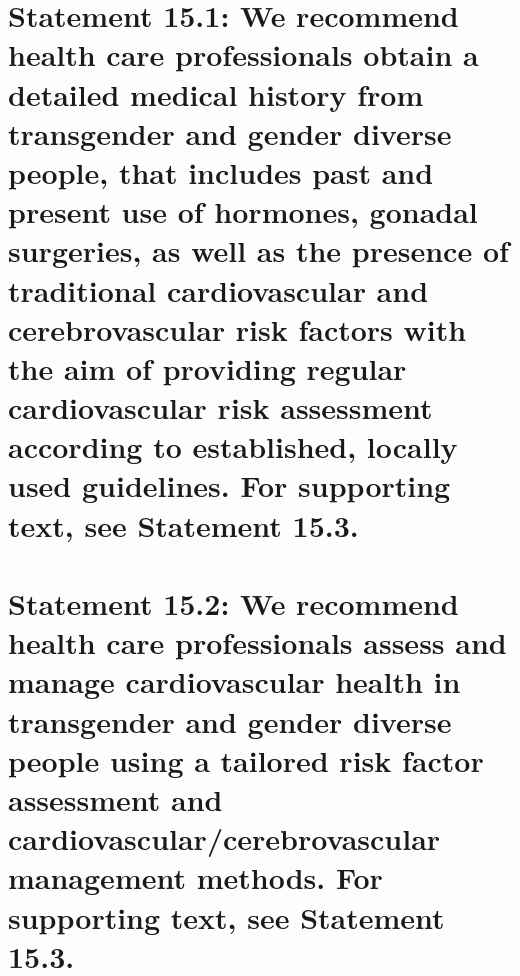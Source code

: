 \documentclass[
]{book}
\begin{document}
\hypertarget{statement-15.1-we-recommend-health-care-professionals-obtain-a-detailed-medical-history-from-transgender-and-gender-diverse-people-that-includes-past-and-present-use-of-hormones-gonadal-surgeries-as-well-as-the-presence-of-traditional-cardiovascular-and-cerebrovascular-risk-factors-with-the-aim-of-providing-regular-cardiovascular-risk-assessment-according-to-established-locally-used-guidelines.-for-supporting-text-see-statement-15.3.}{%
\section*{Statement 15.1: We recommend health care professionals obtain a detailed medical history from transgender and gender diverse people, that includes past and present use of hormones, gonadal surgeries, as well as the presence of traditional cardiovascular and cerebrovascular risk factors with the aim of providing regular cardiovascular risk assessment according to established, locally used guidelines. For supporting text, see Statement 15.3.}\label{statement-15.1-we-recommend-health-care-professionals-obtain-a-detailed-medical-history-from-transgender-and-gender-diverse-people-that-includes-past-and-present-use-of-hormones-gonadal-surgeries-as-well-as-the-presence-of-traditional-cardiovascular-and-cerebrovascular-risk-factors-with-the-aim-of-providing-regular-cardiovascular-risk-assessment-according-to-established-locally-used-guidelines.-for-supporting-text-see-statement-15.3.}}

\hypertarget{statement-15.2-we-recommend-health-care-professionals-assess-and-manage-cardiovascular-health-in-transgender-and-gender-diverse-people-using-a-tailored-risk-factor-assessment-and-cardiovascularcerebrovascular-management-methods.-for-supporting-text-see-statement-15.3.}{%
\section*{Statement 15.2: We recommend health care professionals assess and manage cardiovascular health in transgender and gender diverse people using a tailored risk factor assessment and cardiovascular/cerebrovascular management methods. For supporting text, see Statement 15.3.}\label{statement-15.2-we-recommend-health-care-professionals-assess-and-manage-cardiovascular-health-in-transgender-and-gender-diverse-people-using-a-tailored-risk-factor-assessment-and-cardiovascularcerebrovascular-management-methods.-for-supporting-text-see-statement-15.3.}}
\end{document}
